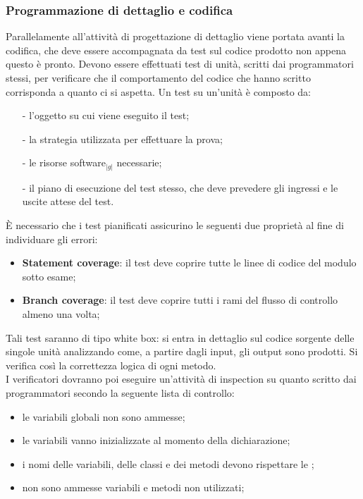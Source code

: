 {{	\subsubsection{Programmazione di dettaglio e codifica}{
		Parallelamente all'attività di progettazione di dettaglio viene portata avanti la codifica, che deve essere accompagnata 
		da test sul codice prodotto non appena questo è pronto. Devono essere effettuati test di unità, scritti dai
		programmatori stessi, per verificare che il comportamento del codice che hanno scritto corrisponda a quanto ci si aspetta. 
		Un test su un'unità è composto da:
		\begin{itemize}
			\item [-] l’oggetto su cui viene eseguito il test;
			\item [-] la strategia utilizzata per effettuare la prova;
			\item [-] le risorse software$_{|g|}$ necessarie;
			\item [-] il piano di esecuzione del test stesso, che deve prevedere gli ingressi e le uscite attese del test.
		\end{itemize}
		\`E necessario che i test pianificati assicurino le seguenti due proprietà al fine di individuare gli errori:
		\begin{itemize}
			\item \textbf{Statement coverage}: il test deve coprire tutte le linee di codice del modulo sotto esame;
			\item \textbf{Branch coverage}: il test deve coprire tutti i rami del flusso di controllo almeno una volta;
		\end{itemize}
		Tali test saranno di tipo white box: si entra in dettaglio sul codice sorgente delle singole unità analizzando come, 
		a partire dagli input, gli output sono prodotti. Si verifica così la correttezza logica di ogni metodo.\\
		I verificatori dovranno poi eseguire un’attività di inspection su quanto scritto dai programmatori secondo la seguente 
		lista di controllo:
		\begin{itemize}
			\item le variabili globali non sono ammesse;
			\item le variabili vanno inizializzate al momento della dichiarazione;
			\item i nomi delle variabili, delle classi e dei metodi devono rispettare le \textit{\NormeDiProgetto};
			\item non sono ammesse variabili e metodi non utilizzati;

\end{itemize}}}}
